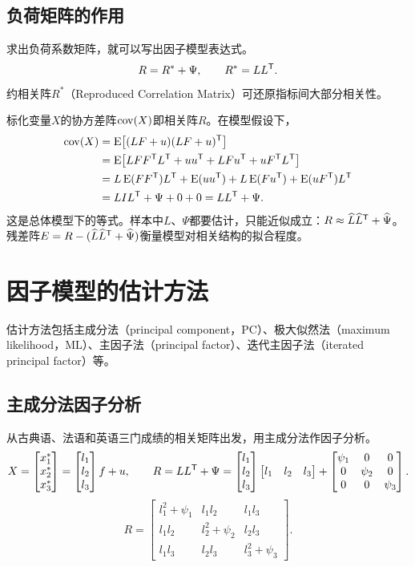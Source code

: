 \subsection{负荷矩阵的作用}
求出负荷系数矩阵，就可以写出因子模型表达式。
\begin{equation}
R=R^*+\Psi,\qquad R^*=LL^{\mathsf T}.
\end{equation}
约相关阵$R^*$（Reproduced Correlation Matrix）可还原指标间大部分相关性。

标化变量$X$的协方差阵$\operatorname{cov}(X)$即相关阵$R$。在模型假设下，
\begin{align*}
\operatorname{cov}(X)&=\operatorname{E}\bigl[(LF+u)(LF+u)^{\mathsf T}\bigr]\\
&=\operatorname{E}\bigl[LFF^{\mathsf T} L^{\mathsf T}+uu^{\mathsf T}+LFu^{\mathsf T}+uF^{\mathsf T} L^{\mathsf T}\bigr]\\
&=L\operatorname{E}(FF^{\mathsf T})L^{\mathsf T}+\operatorname{E}(uu^{\mathsf T})+L\operatorname{E}(Fu^{\mathsf T})+\operatorname{E}(uF^{\mathsf T})L^{\mathsf T}\\
&=LIL^{\mathsf T}+\Psi+0+0=LL^{\mathsf T}+\Psi.
\end{align*}
这是总体模型下的等式。样本中$L$、$\Psi$都要估计，只能近似成立：$R\approx\widehat L\widehat L^{\mathsf T}+\widehat\Psi$。残差阵$E=R-(\widehat L\widehat L^{\mathsf T}+\widehat\Psi)$衡量模型对相关结构的拟合程度。
\section{因子模型的估计方法}
估计方法包括主成分法（principal component，PC）、极大似然法（maximum likelihood，ML）、主因子法（principal factor）、迭代主因子法（iterated principal factor）等。
\subsection{主成分法因子分析}
从古典语、法语和英语三门成绩的相关矩阵出发，用主成分法作因子分析。
\[
X=\begin{bmatrix}x_1^*\\x_2^*\\x_3^*\end{bmatrix}
=\begin{bmatrix}l_1\\l_2\\l_3\end{bmatrix}f+u,
\qquad
R=LL^{\mathsf T}+\Psi=
\begin{bmatrix}l_1\\l_2\\l_3\end{bmatrix}\begin{bmatrix}l_1&l_2&l_3\end{bmatrix}
+\begin{bmatrix}\psi_1&0&0\\0&\psi_2&0\\0&0&\psi_3\end{bmatrix}.
\]
\[
R=\begin{bmatrix}
l_1^2+\psi_1&l_1l_2&l_1l_3\\
l_1l_2&l_2^2+\psi_2&l_2l_3\\
l_1l_3&l_2l_3&l_3^2+\psi_3
\end{bmatrix}.
\]
